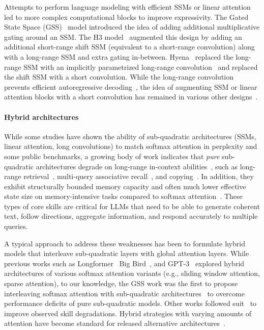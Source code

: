 \documentclass{article}
\begin{document}
Attempts to perform language modeling with efficient SSMs or linear attention led to more complex computational blocks to improve expressivity. The Gated State Space (GSS)~\citep{mehta2023long} model introduced the idea of adding additional multiplicative gating around an SSM. The H3 model~\citep{fu2023hungry} augmented this design by adding an additional short-range shift SSM (equivalent to a short-range convolution) along with a long-range SSM and extra gating in-between. Hyena~\citep{poli2023hyena} replaced the long-range SSM with an implicitly parametrized long-range convolution~\citep{sitzmann2020implicitneuralrepresentationsperiodic, romero2022ckconv} and replaced the shift SSM with a short convolution. While the long-range convolution prevents efficient autoregressive decoding~\citep{massaroli2023laughing}, the idea of augmenting SSM or linear attention blocks with a short convolution has remained in various other designs~\citep{gu2024mamba, dao2024transformers, yang2024parallelizing}. 


\paragraph{Hybrid architectures}
While some studies have shown the ability of sub-quadratic architectures (SSMs, linear attention, long convolutions)  to match softmax attention in perplexity and some public benchmarks, a growing body of work indicates that \emph{pure} sub-quadratic architectures degrade on long-range in-context abilities~\citep{park2024can}, such as long-range retrieval~\citep{wen2025rnns, blouir2024birdie}, multi-query associative recall~\citep{arora2024zoology, arora2024simple}, and copying~\citep{jelassi2024repeat}. In addition, they exhibit structurally bounded memory capacity and often much lower effective state size on memory-intensive tasks compared to softmax attention~\citep{parnichkun2025quantifying}. These types of core skills are critical for LLMs that need to be able to generate coherent text, follow directions, aggregate information, and respond
accurately to multiple queries.

A typical approach to address these weaknesses has been to formulate hybrid models that interleave sub-quadratic layers with global attention layers. While previous works such as Longformer~\citep{beltagy2020longformer} Big Bird~\citep{zaheer2020big}, and GPT-3~\citep{brown2020language} explored hybrid architectures of various softmax attention variants (e.g., sliding window attention, sparse attention), to our knowledge, the GSS work was the first to propose interleaving softmax attention with sub-quadratic architectures~\citep{mehta2023long} to overcome performance deficits of pure sub-quadratic models. Other works followed suit~\citep{fu2023hungry, park2024can} to improve observed skill degradations. Hybrid strategies with varying amounts of attention have become standard for released alternative architectures~\citep{lieber2024jamba, waleffe2024empirical, chen2025minimax, team2025kimi}.
\end{document}
